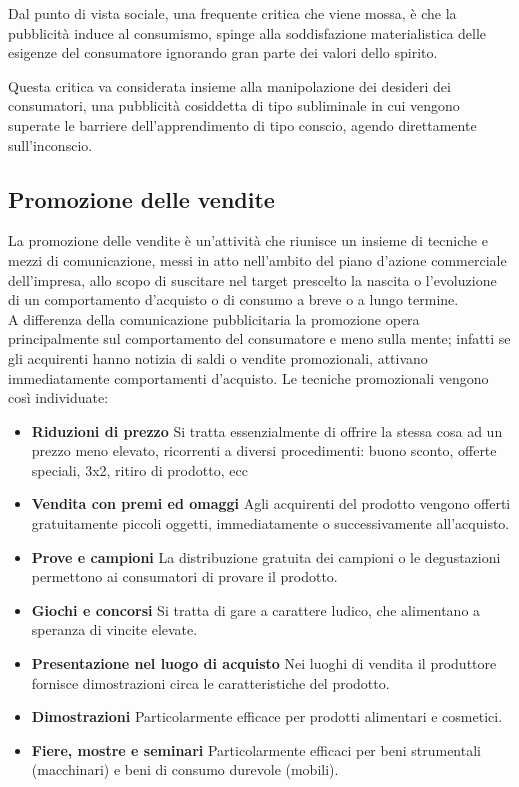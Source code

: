 Dal punto di vista sociale, una frequente critica che viene mossa, è che la pubblicità induce al consumismo, spinge alla soddisfazione materialistica delle esigenze del consumatore ignorando gran parte dei valori dello spirito.

Questa critica va considerata insieme alla manipolazione dei desideri dei consumatori, una pubblicità cosiddetta di tipo subliminale
in cui vengono superate le barriere dell'apprendimento di tipo conscio, agendo direttamente sull'inconscio.

\subsection{Promozione delle vendite}
La promozione delle vendite è un’attività che riunisce un insieme di tecniche e mezzi di comunicazione, messi in atto nell'ambito del piano d’azione commerciale dell'impresa, allo scopo di suscitare nel target prescelto la nascita o l’evoluzione di un comportamento d’acquisto o di consumo a breve o a lungo termine.
\\
A differenza della comunicazione pubblicitaria la promozione opera principalmente sul comportamento del consumatore e meno sulla mente; infatti se gli acquirenti hanno notizia di saldi o vendite promozionali, attivano immediatamente comportamenti d’acquisto. \newline
Le tecniche promozionali vengono così individuate:
\begin{itemize}
	\item \textbf{Riduzioni di prezzo} Si tratta essenzialmente di offrire la stessa cosa ad un prezzo meno elevato, ricorrenti a diversi procedimenti: buono sconto, offerte speciali, 3x2, ritiro di prodotto, ecc
	\item \textbf{Vendita con premi ed omaggi} Agli acquirenti del prodotto vengono offerti gratuitamente piccoli oggetti, immediatamente o successivamente all'acquisto.
	\item \textbf{Prove e campioni} La distribuzione gratuita dei campioni o le degustazioni permettono ai consumatori di provare il prodotto.
	\item \textbf{Giochi e concorsi} Si tratta di gare a carattere ludico, che alimentano a speranza di vincite elevate.
	\item \textbf{Presentazione nel luogo di acquisto} Nei luoghi di vendita il produttore fornisce dimostrazioni circa le caratteristiche del prodotto.
	\item \textbf{Dimostrazioni} Particolarmente efficace per prodotti alimentari e cosmetici.
	\item \textbf{Fiere, mostre e seminari} Particolarmente efficaci per beni strumentali (macchinari) e beni di consumo durevole (mobili).
\end{itemize}

